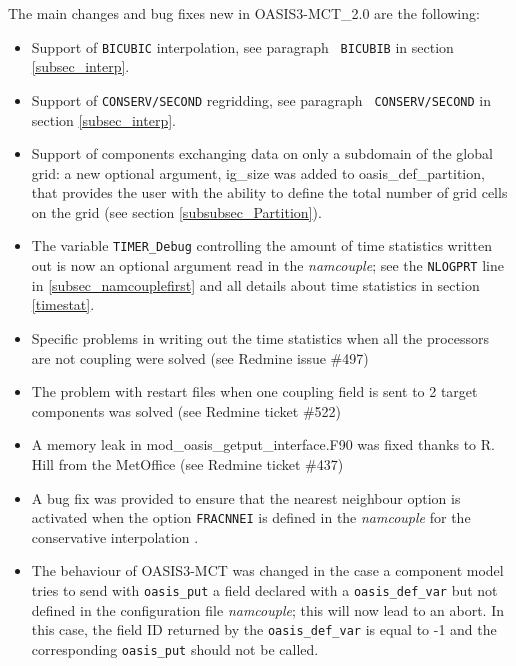 The main changes and bug fixes new in OASIS3-MCT\_2.0 are the
following:
\begin{itemize}

\item Support of {\tt BICUBIC} interpolation, see paragraph {\tt
    BICUBIB} in section \ref{subsec_interp}.

\item Support of {\tt CONSERV/SECOND} regridding, see paragraph {\tt
    CONSERV/SECOND} in section \ref{subsec_interp}.

\item Support of components exchanging data on only a subdomain of the
  global grid: a new optional argument, ig\_size was added to
  oasis\_def\_partition, that provides the user with the ability to
  define the total number of grid cells on the grid (see section
  \ref{subsubsec_Partition}).


\item The variable {\tt TIMER\_Debug} controlling the amount of time
  statistics written out is now an optional argument read in the {\it
    namcouple}; see the {\tt NLOGPRT} line in
  \ref{subsec_namcouplefirst} and all details about time statistics in
  section \ref{timestat}.

\item Specific problems in writing out the time statistics when all
  the processors are not coupling were solved (see Redmine issue
  \#497)

\item The problem with restart files when one coupling field is sent
  to 2 target components was solved (see Redmine ticket \#522)

\item A memory leak in mod\_oasis\_getput\_interface.F90 was fixed
  thanks to R. Hill from the MetOffice (see Redmine ticket \#437)

\item A bug fix was provided to ensure that the nearest neighbour
  option is activated when the option {\tt FRACNNEI} is defined in the
  {\it namcouple} for the conservative interpolation .

\item The behaviour of OASIS3-MCT was changed in the case a
  component model tries to send with {\tt oasis\_put} a field declared
  with a {\tt oasis\_def\_var} but not defined in the configuration
  file {\it namcouple}; this will now lead to an abort. In this case,
  the field ID returned by the {\tt oasis\_def\_var} is equal to -1
  and the corresponding {\tt oasis\_put} should not be called.


\end{itemize}
